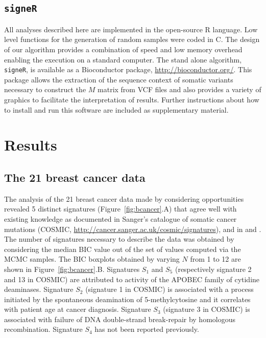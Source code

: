 \documentclass{bioinfo}
\newcommand{\CC}{C\nolinebreak\hspace{-.05em}\raisebox{.4ex}{\tiny
    +}\nolinebreak\hspace{-.15em}\raisebox{.4ex}{\tiny +}}
\begin{document}
\subsection{\texttt{signeR}}
All analyses described here are implemented in the open-source R
language. Low level functions for the generation of random samples
were coded in \CC. The design of our algorithm provides a combination
of speed and low memory overhead enabling the execution on a standard
computer. The stand alone algorithm, \texttt{signeR}, is available as
a Bioconductor package, \url{http://bioconductor.org/}. This package
allows the extraction of the sequence context of somatic variants
necessary to construct the $M$ matrix from VCF files and also
provides a variety of graphics to facilitate the interpretation of
results. Further instructions about how to install and run this
software are included as supplementary material.

\section{Results}
\subsection{The 21 breast cancer data}
The analysis of the 21 breast cancer data made by considering
opportunities revealed 5 distinct signatures
(Figure~\ref{fig:bcancer}.A) that agree well with existing knowledge
as documented in Sanger's catalogue of somatic cancer mutations
(COSMIC, \url{http://cancer.sanger.ac.uk/cosmic/signatures}), and
in \cite{HEN} and \cite{ANat}. The number of signatures necessary to
describe the data was obtained by considering the median BIC value out
of the set of values computed via the MCMC samples. The BIC boxplots
obtained by varying $N$ from 1 to 12 are shown in
Figure~\ref{fig:bcancer}.B. Signatures $S_1$ and $S_5$ (respectively
signature 2 and 13 in COSMIC) are attributed to activity of the APOBEC
family of cytidine deaminases.  Signature $S_2$ (signature 1 in
COSMIC) is associated with a process initiated by the spontaneous
deamination of 5-methylcytosine and it correlates with patient age at
cancer diagnosis. Signature $S_3$ (signature 3 in COSMIC) is
associated with failure of DNA double-strand break-repair by
homologous recombination. Signature $S_4$ has not been reported
previously.
\end{document}
